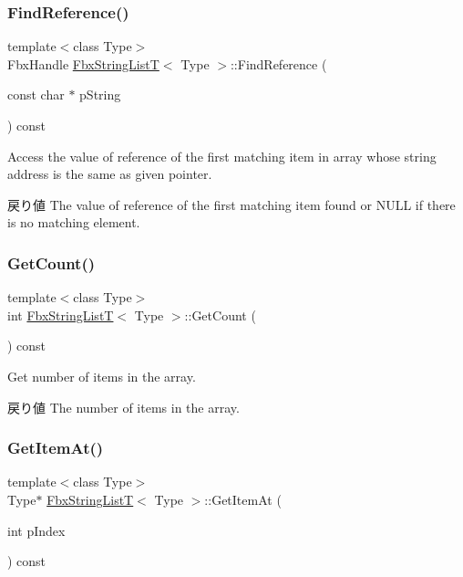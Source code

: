 \subsubsection{\texorpdfstring{Find\+Reference()}{FindReference()}}
{\footnotesize\ttfamily template$<$class Type$>$ \\
Fbx\+Handle \hyperlink{class_fbx_string_list_t}{Fbx\+String\+ListT}$<$ Type $>$\+::Find\+Reference (\begin{DoxyParamCaption}\item[{const char $\ast$}]{p\+String }\end{DoxyParamCaption}) const}

Access the value of reference of the first matching item in array whose string address is the same as given pointer. \begin{DoxyReturn}{戻り値}
The value of reference of the first matching item found or N\+U\+LL if there is no matching element. 
\end{DoxyReturn}
\mbox{\label{class_fbx_string_list_t_a4b881e2791c4b9a8b1abf5c845c3ddb1}} 
\subsubsection{\texorpdfstring{Get\+Count()}{GetCount()}}
{\footnotesize\ttfamily template$<$class Type$>$ \\
int \hyperlink{class_fbx_string_list_t}{Fbx\+String\+ListT}$<$ Type $>$\+::Get\+Count (\begin{DoxyParamCaption}{ }\end{DoxyParamCaption}) const}

Get number of items in the array. \begin{DoxyReturn}{戻り値}
The number of items in the array. 
\end{DoxyReturn}
\mbox{\label{class_fbx_string_list_t_a86ee3c651fea2cb1fe50896bc93ef685}} 
\subsubsection{\texorpdfstring{Get\+Item\+At()}{GetItemAt()}}
{\footnotesize\ttfamily template$<$class Type$>$ \\
Type$\ast$ \hyperlink{class_fbx_string_list_t}{Fbx\+String\+ListT}$<$ Type $>$\+::Get\+Item\+At (\begin{DoxyParamCaption}\item[{int}]{p\+Index }\end{DoxyParamCaption}) const}



